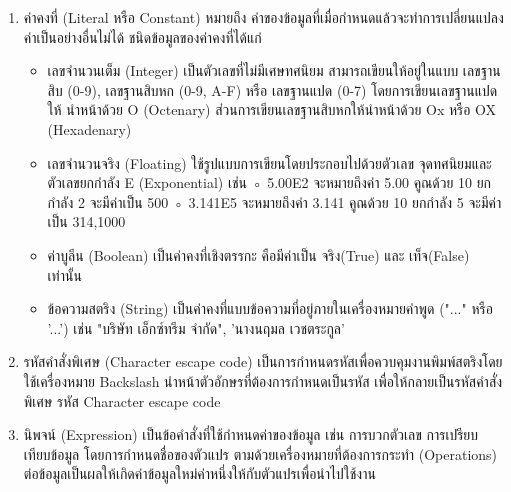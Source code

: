 \begin{enumerate}
		 \item ค่าคงที่ (Literal หรือ Constant) หมายถึง ค่าของข้อมูลที่เมื่อกำหนดแล้วจะทำการเปลี่ยนแปลงค่าเป็นอย่างอื่นไม่ได้ ชนิดข้อมูลของค่าคงที่ได้แก่
			 \begin{itemize}
				  \item เลขจำนวนเต็ม (Integer) เป็นตัวเลขที่ไม่มีเศษทศนิยม สามารถเขียนให้อยู่ในแบบ เลขฐานสิบ (0-9), เลขฐานสิบหก (0-9, A-F) หรือ เลขฐานแปด (0-7) โดยการเขียนเลขฐานแปดให้ นำหน้าด้วย O  (Octenary) ส่วนการเขียนเลขฐานสิบหกให้นำหน้าด้วย Ox หรือ OX (Hexadenary) 
				  \item เลขจำนวนจริง (Floating) ใช้รูปแบบการเขียนโดยประกอบไปด้วยตัวเลข จุดทศนิยมและตัวเลขยกกำลัง E (Exponential) เช่น 
				  ◦ 5.00E2 จะหมายถึงค่า 5.00 คูณด้วย 10 ยกกำลัง 2 จะมีค่าเป็น 500 
				  ◦ 3.141E5 จะหมายถึงค่า 3.141 คูณด้วย 10 ยกกำลัง 5 จะมีค่าเป็น 314,1000 
				  \item ค่าบูลีน (Boolean) เป็นค่าคงที่เชิงตรรกะ คือมีค่าเป็น จริง(True) และ เท็จ(False) เท่านั้น 
				  \item ข้อความสตริง (String) เป็นค่าคงที่แบบข้อความที่อยู่ภายในเครื่องหมายคำพูด ("..." หรือ '...') เช่น "บริษัท เอ็กซ์ทรีม จำกัด", 'นางนฤมล เวชตระกูล' 
			 \end{itemize}
		
		 \item รหัสคำสั่งพิเศษ (Character escape code) เป็นการกำหนดรหัสเพื่อควบคุมงานพิมพ์สตริงโดยใช้เครื่องหมาย Backslash นำหน้าตัวอักษรที่ต้องการกำหนดเป็นรหัส เพื่อให้กลายเป็นรหัสคำสั่งพิเศษ
		 รหัส Character escape code
		 
		 \item นิพจน์ (Expression) เป็นข้อคำสั่งที่ใช้กำหนดค่าของข้อมูล เช่น การบวกตัวเลข การเปรียบเทียบข้อมูล โดยการกำหนดชื่อของตัวแปร ตามด้วยเครื่องหมายที่ต้องการกระทำ (Operations) ต่อข้อมูลเป็นผลให้เกิดค่าข้อมูลใหม่ค่าหนึ่งให้กับตัวแปรเพื่อนำไปใช้งาน
		 

\end{enumerate}
